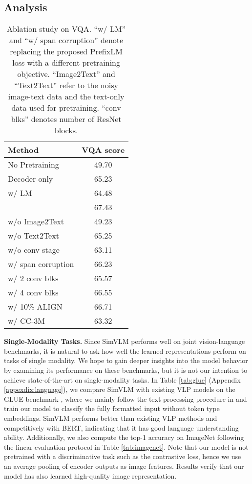 \documentclass{article} \usepackage{iclr2022_conference,times}
\newcommand{\ours}{SimVLM}
\begin{document}
\subsection{Analysis}
\label{sec:ablation}



\begin{wraptable}{r}{0.5\textwidth}
\begin{footnotesize}
\begin{center}
\begin{tabular}{l | c}
\toprule
Method & VQA score  \\
\bottomrule
\toprule
No Pretraining & 49.70  \\
Decoder-only & 65.23 \\
\quad w/ LM & 64.48 \\
\bottomrule
\toprule
 & 67.43  \\
\quad w/o Image2Text & 49.23   \\
\quad w/o Text2Text & 65.25   \\
\quad w/o conv stage & 63.11  \\
\quad w/ span corruption & 66.23  \\
\quad w/ 2 conv blks & 65.57  \\
\quad w/ 4 conv blks & 66.55 \\
\quad w/ 10\% ALIGN & 66.71  \\
\quad w/ CC-3M & 63.32 \\
\bottomrule
\end{tabular}
\end{center}
\caption[caption]{Ablation study on VQA. ``w/ LM'' and ``w/ span corruption'' denote replacing the proposed PrefixLM loss with a different pretraining objective. ``Image2Text'' and ``Text2Text'' refer to the noisy image-text data and the text-only data used for pretraining. ``conv blks'' denotes number of ResNet blocks.} 
\label{tab:ablation}
\end{footnotesize}
\end{wraptable}


\textbf{Single-Modality Tasks.}
Since {\ours} performs well on joint vision-language benchmarks,
it is natural to ask how well the learned representations perform on tasks of single modality. We hope to gain deeper insights into the model behavior by examining its performance on these benchmarks, but it is not our intention to achieve state-of-the-art on single-modality tasks.
In Table \ref{tab:glue} (Appendix \ref{appexdix:language}),
we compare {\ours} with existing VLP models on the GLUE benchmark \citep{wang2018glue}, where we mainly follow the text processing procedure in \cite{raffel2019exploring} and train our model to classify the fully formatted input without token type embeddings. {\ours} performs better than existing VLP methods and competitively with BERT, indicating that it has good language understanding ability. Additionally,
we also compute the top-1 accuracy on ImageNet following the linear evaluation protocol in Table \ref{tab:imagenet}. Note that our model is not pretrained with a discriminative task such as the contrastive loss, hence we use an average pooling of encoder outputs as image features. Results verify that our model has also learned high-quality image representation.
\end{document}
